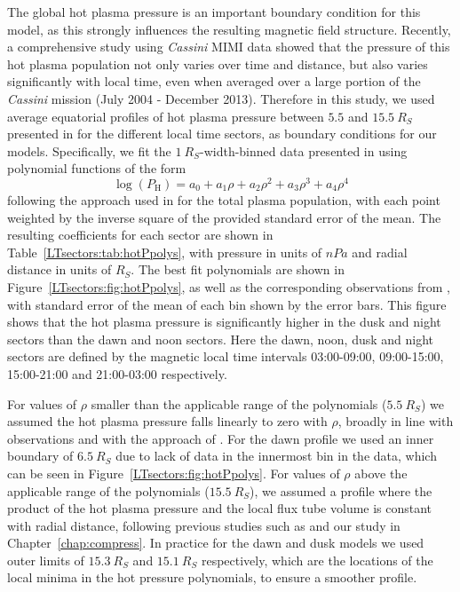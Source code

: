 The global hot plasma pressure is an important boundary condition for this model, as this strongly influences the resulting magnetic field structure. Recently, a comprehensive study using \textit{Cassini} MIMI data \citep{sergis2017} showed that the pressure of this hot plasma population not only varies over time and distance, but also varies significantly with local time, even when averaged over a large portion of the \textit{Cassini} mission (July 2004 - December 2013). Therefore in this study, we used average equatorial profiles of hot plasma pressure between $5.5$ and $\SI{15.5}{R_S}$ presented in \citet{sergis2017} for the different local time sectors, as boundary conditions for our models. Specifically, we fit the $\SI{1}{R_S}$-width-binned data presented in \citet{sergis2017} using polynomial functions of the form 
\begin{equation} \label{LTsectors:eq:fourthorderpoly}
\log(P_\mathrm{H}) = a_0+a_1\rho + a_2\rho^2 + a_3\rho^3 + a_4\rho^4
\end{equation}
following the approach used in \citet{sergis2017} for the total plasma population, with each point weighted by the inverse square of the provided standard error of the mean. The resulting coefficients for each sector are shown in Table~\ref{LTsectors:tab:hotPpolys}, with pressure in units of $\si{nPa}$ and radial distance in units of $\si{R_S}$. The best fit polynomials are shown in Figure~\ref{LTsectors:fig:hotPpolys}, as well as the corresponding observations from \citet{sergis2017}, with standard error of the mean of each bin shown by the error bars. This figure shows that the hot plasma pressure is significantly higher in the dusk and night sectors than the dawn and noon sectors. Here the dawn, noon, dusk and night sectors are defined by the magnetic local time intervals 03:00-09:00, 09:00-15:00, 15:00-21:00 and 21:00-03:00 respectively.

For values of $\rho$ smaller than the applicable range of the polynomials ($\SI{5.5}{R_S}$) we assumed the hot plasma pressure falls linearly to zero with $\rho$, broadly in line with observations and with the approach of \citet{achilleos2010a}. For the dawn profile we used an inner boundary of $\SI{6.5}{R_S}$ due to lack of data in the innermost bin in the \citet{sergis2017} data, which can be seen in Figure~\ref{LTsectors:fig:hotPpolys}. For values of $\rho$ above the applicable range of the polynomials ($\SI{15.5}{R_S}$), we assumed a profile where the product of the hot plasma pressure and the local flux tube volume is constant with radial distance, following previous studies such as \citet{achilleos2010a} and our study in Chapter~\ref{chap:compress}. In practice for the dawn and dusk models we used outer limits of $\SI{15.3}{R_S}$ and $\SI{15.1}{R_S}$ respectively, which are the locations of the local minima in the hot pressure polynomials, to ensure a smoother profile.

